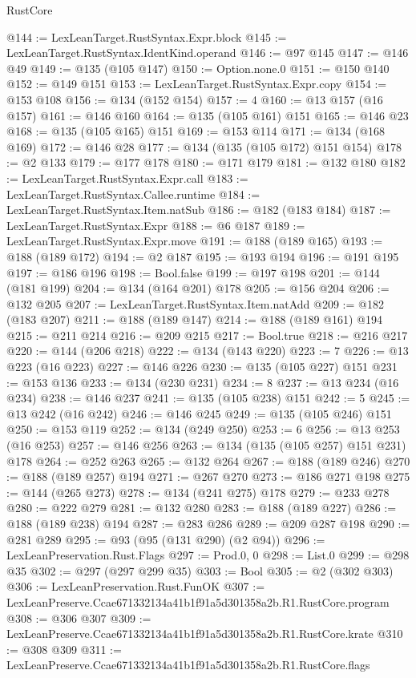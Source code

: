 \begin{lexlean}{RustCore}
\begin{coremodule}
@144 := LexLeanTarget.RustSyntax.Expr.block
@145 := LexLeanTarget.RustSyntax.IdentKind.operand
@146 := @97 @145
@147 := @146 @49
@149 := @135 (@105 @147)
@150 := Option.none.{0}
@151 := @150 @140
@152 := @149 @151
@153 := LexLeanTarget.RustSyntax.Expr.copy
@154 := @153 @108
@156 := @134 (@152 @154)
@157 := 4
@160 := @13 @157 (@16 @157)
@161 := @146 @160
@164 := @135 (@105 @161) @151
@165 := @146 @23
@168 := @135 (@105 @165) @151
@169 := @153 @114
@171 := @134 (@168 @169)
@172 := @146 @28
@177 := @134 (@135 (@105 @172) @151 @154)
@178 := @2 @133
@179 := @177 @178
@180 := @171 @179
@181 := @132 @180
@182 := LexLeanTarget.RustSyntax.Expr.call
@183 := LexLeanTarget.RustSyntax.Callee.runtime
@184 := LexLeanTarget.RustSyntax.Item.natSub
@186 := @182 (@183 @184)
@187 := LexLeanTarget.RustSyntax.Expr
@188 := @6 @187
@189 := LexLeanTarget.RustSyntax.Expr.move
@191 := @188 (@189 @165)
@193 := @188 (@189 @172)
@194 := @2 @187
@195 := @193 @194
@196 := @191 @195
@197 := @186 @196
@198 := Bool.false
@199 := @197 @198
@201 := @144 (@181 @199)
@204 := @134 (@164 @201) @178
@205 := @156 @204
@206 := @132 @205
@207 := LexLeanTarget.RustSyntax.Item.natAdd
@209 := @182 (@183 @207)
@211 := @188 (@189 @147)
@214 := @188 (@189 @161) @194
@215 := @211 @214
@216 := @209 @215
@217 := Bool.true
@218 := @216 @217
@220 := @144 (@206 @218)
@222 := @134 (@143 @220)
@223 := 7
@226 := @13 @223 (@16 @223)
@227 := @146 @226
@230 := @135 (@105 @227) @151
@231 := @153 @136
@233 := @134 (@230 @231)
@234 := 8
@237 := @13 @234 (@16 @234)
@238 := @146 @237
@241 := @135 (@105 @238) @151
@242 := 5
@245 := @13 @242 (@16 @242)
@246 := @146 @245
@249 := @135 (@105 @246) @151
@250 := @153 @119
@252 := @134 (@249 @250)
@253 := 6
@256 := @13 @253 (@16 @253)
@257 := @146 @256
@263 := @134 (@135 (@105 @257) @151 @231) @178
@264 := @252 @263
@265 := @132 @264
@267 := @188 (@189 @246)
@270 := @188 (@189 @257) @194
@271 := @267 @270
@273 := @186 @271 @198
@275 := @144 (@265 @273)
@278 := @134 (@241 @275) @178
@279 := @233 @278
@280 := @222 @279
@281 := @132 @280
@283 := @188 (@189 @227)
@286 := @188 (@189 @238) @194
@287 := @283 @286
@289 := @209 @287 @198
@290 := @281 @289
@295 := @93 (@95 (@131 @290) (@2 @94))
@296 := LexLeanPreservation.Rust.Flags
@297 := Prod.{0, 0}
@298 := List.{0}
@299 := @298 @35
@302 := @297 (@297 @299 @35)
@303 := Bool
@305 := @2 (@302 @303)
@306 := LexLeanPreservation.Rust.FunOK
@307 := LexLeanPreserve.Ccae671332134a41b1f91a5d301358a2b.R1.RustCore.program
@308 := @306 @307
@309 := LexLeanPreserve.Ccae671332134a41b1f91a5d301358a2b.R1.RustCore.krate
@310 := @308 @309
@311 := LexLeanPreserve.Ccae671332134a41b1f91a5d301358a2b.R1.RustCore.flags

\end{coremodule}
\end{lexlean}
